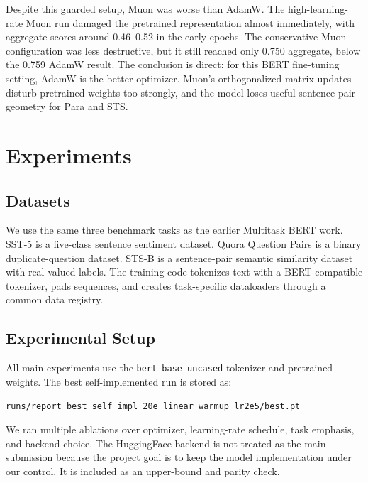\documentclass{article}
\begin{document}
Despite this guarded setup, Muon was worse than AdamW. The high-learning-rate Muon run damaged the pretrained representation almost immediately, with aggregate scores around 0.46--0.52 in the early epochs. The conservative Muon configuration was less destructive, but it still reached only 0.750 aggregate, below the 0.759 AdamW result. The conclusion is direct: for this BERT fine-tuning setting, AdamW is the better optimizer. Muon's orthogonalized matrix updates disturb pretrained weights too strongly, and the model loses useful sentence-pair geometry for Para and STS.

\section{Experiments}

\subsection{Datasets}

We use the same three benchmark tasks as the earlier Multitask BERT work. SST-5 is a five-class sentence sentiment dataset. Quora Question Pairs is a binary duplicate-question dataset. STS-B is a sentence-pair semantic similarity dataset with real-valued labels. The training code tokenizes text with a BERT-compatible tokenizer, pads sequences, and creates task-specific dataloaders through a common data registry.

\subsection{Experimental Setup}

All main experiments use the \texttt{bert-base-uncased} tokenizer and pretrained weights. The best self-implemented run is stored as:
\begin{center}
\small
\texttt{runs/report\_best\_self\_impl\_20e\_linear\_warmup\_lr2e5/best.pt}
\end{center}

We ran multiple ablations over optimizer, learning-rate schedule, task emphasis, and backend choice. The HuggingFace backend is not treated as the main submission because the project goal is to keep the model implementation under our control. It is included as an upper-bound and parity check.
\end{document}
